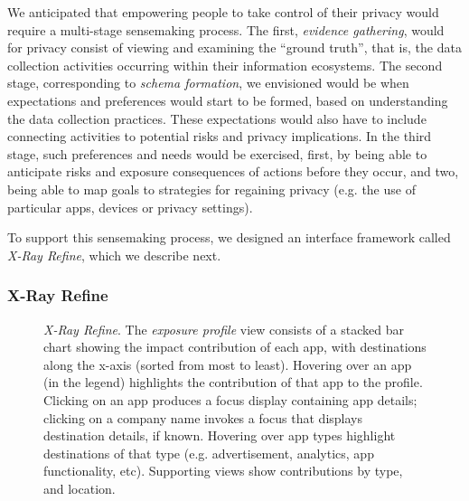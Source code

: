 \documentclass[sigchi-a, authorversion]{acmart}
\begin{document}
We anticipated that empowering people to take control of their privacy would require a 
multi-stage sensemaking process. The first, \emph{evidence gathering}, would for privacy
consist of viewing and examining the ``ground truth'', that is, the data collection 
activities occurring within their information ecosystems.  The second stage, corresponding
to \emph{schema formation}, we envisioned would be when expectations and preferences would
start to be formed, based on understanding the data collection practices.  These expectations
would also have to include connecting activities to potential risks and privacy implications. 
In the third stage, such preferences and needs would be exercised, first, by being able to 
anticipate risks and exposure consequences of actions before they occur, and two, being 
able to map goals to strategies for regaining privacy (e.g. the use of particular apps, devices or privacy settings).

To support this sensemaking process, we designed an interface framework called \emph{X-Ray Refine}, 
which we describe next.  

\subsubsection{X-Ray Refine}

\begin{figure}[b]
  \centering
  \setlength\fboxsep{0pt}
  \setlength\fboxrule{0pt}

  \caption{\emph{X-Ray Refine}. The \emph{exposure profile} view consists
  of a stacked bar chart showing the impact contribution of each app,
  with destinations along the x-axis (sorted from most to least). 
  Hovering over an app (in the legend) highlights the contribution of that app to the profile. Clicking
  on an app produces a focus display containing app details; clicking on a 
  company name invokes a focus that displays destination details, if known. 
  Hovering over app types highlight destinations of that type (e.g. advertisement, analytics, app
  functionality, etc). Supporting views show contributions by type, and 
  location.}

  \label{f7}
\end{figure}
\end{document}
